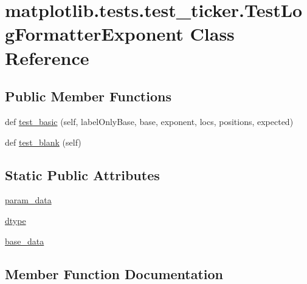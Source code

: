 \hypertarget{classmatplotlib_1_1tests_1_1test__ticker_1_1TestLogFormatterExponent}{}\section{matplotlib.\+tests.\+test\+\_\+ticker.\+Test\+Log\+Formatter\+Exponent Class Reference}
\label{classmatplotlib_1_1tests_1_1test__ticker_1_1TestLogFormatterExponent}
\subsection*{Public Member Functions}
\begin{DoxyCompactItemize}
\item 
def \hyperlink{classmatplotlib_1_1tests_1_1test__ticker_1_1TestLogFormatterExponent_a4689f7651be53866bbba6fd7a82c1eac}{test\+\_\+basic} (self, label\+Only\+Base, base, exponent, locs, positions, expected)
\item 
def \hyperlink{classmatplotlib_1_1tests_1_1test__ticker_1_1TestLogFormatterExponent_a7a49d508c7306eb934d19bce80eb33fb}{test\+\_\+blank} (self)
\end{DoxyCompactItemize}
\subsection*{Static Public Attributes}
\begin{DoxyCompactItemize}
\item 
\hyperlink{classmatplotlib_1_1tests_1_1test__ticker_1_1TestLogFormatterExponent_ad5668f90795f844ad4b19562e1afbbf9}{param\+\_\+data}
\item 
\hyperlink{classmatplotlib_1_1tests_1_1test__ticker_1_1TestLogFormatterExponent_a73420719d2ac1da57f71380a426ce9fe}{dtype}
\item 
\hyperlink{classmatplotlib_1_1tests_1_1test__ticker_1_1TestLogFormatterExponent_a96485479c8ce683d485b2bfe0bcd92a8}{base\+\_\+data}
\end{DoxyCompactItemize}


\subsection{Member Function Documentation}
\mbox{\label{classmatplotlib_1_1tests_1_1test__ticker_1_1TestLogFormatterExponent_a4689f7651be53866bbba6fd7a82c1eac}} 

